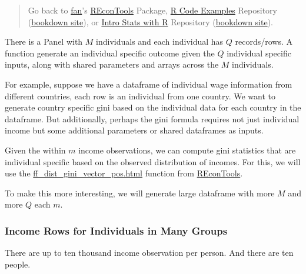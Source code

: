 \documentclass[
]{book}
\begin{document}
\begin{quote}
Go back to \href{http://fanwangecon.github.io/}{fan}'s \href{https://fanwangecon.github.io/REconTools/}{REconTools} Package, \href{https://fanwangecon.github.io/R4Econ/}{R Code Examples} Repository (\href{https://fanwangecon.github.io/R4Econ/bookdown}{bookdown site}), or \href{https://fanwangecon.github.io/Stat4Econ/}{Intro Stats with R} Repository (\href{https://fanwangecon.github.io/Stat4Econ/bookdown}{bookdown site}).
\end{quote}

There is a Panel with \(M\) individuals and each individual has \(Q\) records/rows. A function generate an individual specific outcome given the \(Q\) individual specific inputs, along with shared parameters and arrays across the \(M\) individuals.

For example, suppose we have a dataframe of individual wage information from different countries, each row is an individual from one country. We want to generate country specific gini based on the individual data for each country in the dataframe. But additionally, perhaps the gini formula requires not just individual income but some additional parameters or shared dataframes as inputs.

Given the within \(m\) income observations, we can compute gini statistics that are individual specific based on the observed distribution of incomes. For this, we will use the \href{https://fanwangecon.github.io/REconTools/reference/ff_dist_gini_vector_pos.html}{ff\_dist\_gini\_vector\_pos.html} function from \href{https://fanwangecon.github.io/REconTools/}{REconTools}.

To make this more interesting, we will generate large dataframe with more \(M\) and more \(Q\) each \(m\).

\hypertarget{income-rows-for-individuals-in-many-groups}{%
\subsubsection{Income Rows for Individuals in Many Groups}\label{income-rows-for-individuals-in-many-groups}}

There are up to ten thousand income observation per person. And there are ten people.
\end{document}
